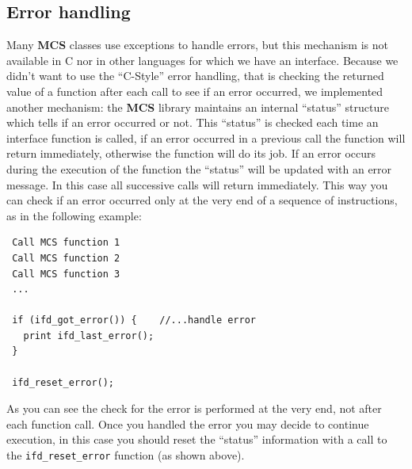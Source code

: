 \documentclass[12pt,titlepage]{article}
\newcommand{\mcs}{\textbf{MCS} }
\begin{document}
\subsection{Error handling}
\label{ssec-Error handling}
Many \mcs classes use exceptions to handle errors, but this mechanism
is not available in C nor in other languages for which we have an
interface. Because we didn't want to use the ``C-Style'' error
handling, that is checking the returned value of a function after each
call to see if an error occurred, we implemented another mechanism:
the \mcs library maintains an internal ``status'' structure which tells
if an error occurred or not. This ``status'' is checked each time an
interface function is called, if an error occurred in a previous call
the function will return immediately, otherwise the function will do
its job. If an error occurs during the execution of the function the
``status'' will be updated with an error message. In this case all
successive calls will return immediately. This way you can check if an
error occurred only at the very end of a sequence of instructions, as
in the following example:
%
\begin{verbatim}
 Call MCS function 1
 Call MCS function 2
 Call MCS function 3
 ...

 if (ifd_got_error()) {    //...handle error
   print ifd_last_error();
 }

 ifd_reset_error();
\end{verbatim}
%
As you can see the check for the error is performed at the very end,
not after each function call. Once you handled the error you may
decide to continue execution, in this case you should reset the
``status'' information with a call to the \verb|ifd_reset_error|
function (as shown above).
%
%
\end{document}
